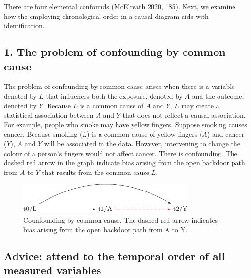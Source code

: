 \documentclass[
  singlecolumn]{report}
\begin{document}
There are four elemental confounds
(\protect\hyperlink{ref-mcelreath2020}{McElreath 2020, 185}). Next, we
examine how the employing chronological order in a causal diagram aids
with identification.

\hypertarget{the-problem-of-confounding-by-common-cause}{%
\subsection{1. The problem of confounding by common
cause}\label{the-problem-of-confounding-by-common-cause}}

The problem of confounding by common cause arises when there is a
variable denoted by \(L\) that influences both the exposure, denoted by
\(A\) and the outcome, denoted by \(Y.\) Because \(L\) is a common cause
of \(A\) and \(Y\), \(L\) may create a statistical association between
\(A\) and \(Y\) that does not reflect a causal association. For example,
people who smoke may have yellow fingers. Suppose smoking causes cancer.
Because smoking (\(L\)) is a common cause of yellow fingers (\(A\)) and
cancer (\(Y\)), \(A\) and \(Y\) will be associated in the data. However,
intervening to change the colour of a person's fingers would not affect
cancer. There is confounding. The dashed red arrow in the graph indicate
bias arising from the open backdoor path from \(A\) to \(Y\) that
results from the common cause \(L\).

\begin{figure}

{\centering \includegraphics[width=0.8\textwidth,height=\textheight]{causal-dags_files/figure-pdf/fig-dag-common-cause-1.pdf}

}

\caption{\label{fig-dag-common-cause}Counfounding by common cause. The
dashed red arrow indicates bias arising from the open backdoor path from
A to Y.}

\end{figure}

\hypertarget{advice-attend-to-the-temporal-order-of-all-measured-variables}{%
\subsection{Advice: attend to the temporal order of all measured
variables}\label{advice-attend-to-the-temporal-order-of-all-measured-variables}}
\end{document}
